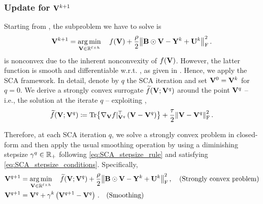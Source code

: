 \subsubsection{\texorpdfstring{Update for $\mathbf{V}^{k+1}$}{Update for V}}\label{subsec:updateV_full}
Starting from , the subproblem we have to solve is
\begin{equation}\label{eq:updateV_nonconvex_full}
    \mathbf{V}^{k+1}=\operatorname*{arg\,min}_{\mathbf{V} \in \mathbb{R}^{\ell \times h}}\quad f(\mathbf{V}) + \frac{\rho}{2}\norm{\mathbf{B}\odot\mathbf{V} - \mathbf{Y}^k +\mathbf{U}^k}_{\mathrm{F}}^2\,.
\end{equation}
 is nonconvex due to the inherent nonconvexity of $f(\mathbf{V})$.
However, the latter function is smooth and differentiable w.r.t. \V, as given in .
Hence, we apply the SCA framework.
In detail, denote by $q$ the SCA iteration and set $\mathbf{V}^0=\mathbf{V}^k$ for $q=0$.
We derive a strongly convex surrogate $\widetilde{f}(\mathbf{V};\mathbf{V}^q)$ around the point $\mathbf{V}^q$ -- i.e., the solution at the iterate $q$ -- exploiting , 
\begin{equation}\label{eq:strongly_convex_surrogate_Vfull}
    \widetilde{f}(\V;\V^q) \coloneqq \Tr{\Egrad{\V}{f}\at{\V^q}^\top \left(\V - \V^q\right)} + \frac{\tau}{2}\frob{\V -\V^q}^2\,.
\end{equation}

Therefore, at each SCA iteration $q$, we solve a strongly convex problem in closed-form and then apply the usual smoothing operation by using a diminishing stepsize $\gamma^q \in \mathbb{R}_+$ following \cref{eq:SCA_stepsize_rule} and satisfying \cref{eq:SCA_stepsize_conditions}.
Specifically,
\begin{equation}\label{eq:SCA_recursion_V_full}
    \begin{aligned}        
        \mathbf{V}^{q+1} &= \operatorname*{arg\,min}_{\mathbf{V} \in \mathbb{R}^{\ell \times h}}\quad \widetilde{f}(\mathbf{V};\mathbf{V}^q) +\frac{\rho}{2}\norm{\mathbf{B}\odot\mathbf{V} - \mathbf{Y}^k +\mathbf{U}^k}_{\mathrm{F}}^2\,, \quad\textrm{(Strongly convex problem)}\\
        \mathbf{V}^{q+1} &= \mathbf{V}^q + \gamma^k\left(\mathbf{V}^{q+1}-\mathbf{V}^q\right)\,. \quad\textrm{(Smoothing)}
    \end{aligned}
\end{equation}

